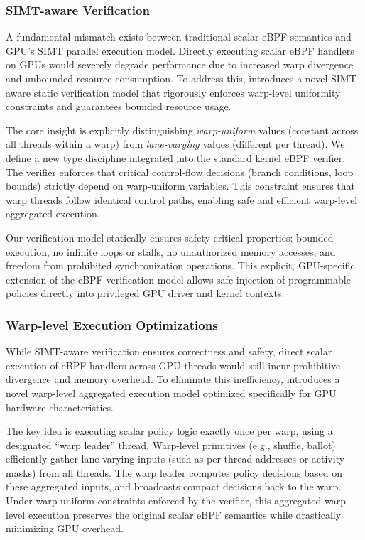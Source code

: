 \subsubsection{SIMT-aware Verification}

A fundamental mismatch exists between traditional scalar eBPF semantics and GPU's SIMT parallel execution model. Directly executing scalar eBPF handlers on GPUs would severely degrade performance due to increased warp divergence and unbounded resource consumption. To address this, \sys introduces a novel SIMT-aware static verification model that rigorously enforces warp-level uniformity constraints and guarantees bounded resource usage.

The core insight is explicitly distinguishing \emph{warp-uniform} values (constant across all threads within a warp) from \emph{lane-varying} values (different per thread). We define a new type discipline integrated into the standard kernel eBPF verifier. The verifier enforces that critical control-flow decisions (branch conditions, loop bounds) strictly depend on warp-uniform variables. This constraint ensures that warp threads follow identical control paths, enabling safe and efficient warp-level aggregated execution.

Our verification model statically ensures safety-critical properties: bounded execution, no infinite loops or stalls, no unauthorized memory accesses, and freedom from prohibited synchronization operations. This explicit, GPU-specific extension of the eBPF verification model allows safe injection of programmable policies directly into privileged GPU driver and kernel contexts.

\subsubsection{Warp-level Execution Optimizations}

While SIMT-aware verification ensures correctness and safety, direct scalar execution of eBPF handlers across GPU threads would still incur prohibitive divergence and memory overhead. To eliminate this inefficiency, \sys introduces a novel warp-level aggregated execution model optimized specifically for GPU hardware characteristics.

The key idea is executing scalar policy logic exactly once per warp, using a designated ``warp leader'' thread. Warp-level primitives (e.g., shuffle, ballot) efficiently gather lane-varying inputs (such as per-thread addresses or activity masks) from all threads. The warp leader computes policy decisions based on these aggregated inputs, and broadcasts compact decisions back to the warp. Under warp-uniform constraints enforced by the verifier, this aggregated warp-level execution preserves the original scalar eBPF semantics while drastically minimizing GPU overhead.

